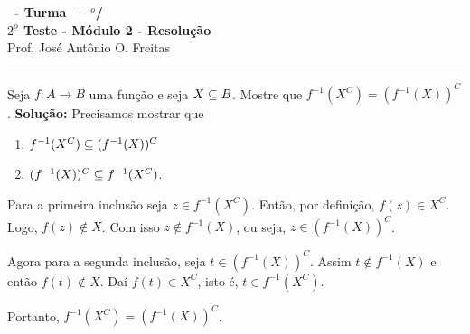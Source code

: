 \documentclass[12pt]{exam}
\begin{document}
\begin{center}
{\Large\bf \disciplina\ - Turma \turma\ -- \semestre$^{o}$/\ano} \\ \vspace{9pt} {\large\bf
$2^{\underline{o}}$ Teste - M\'odulo 2 - Resolu\c{c}\~ao}\\
\vspace{9pt} Prof. Jos{\'e} Ant{\^o}nio O. Freitas
\end{center}
\hrule

\vspace{.6cm}

\questao Seja $f : A \to B$ uma fun{\c c}{\~a}o e seja $X \subseteq B$. Mostre que $f^{-1}(X^C) = (f^{-1}(X))^C$.
\noindent\textbf{Solu\c{c}\~ao:} Precisamos mostrar que
\begin{enumerate}
    \item $f^{-1}(X^C) \subseteq (f^{-1}(X))^C$
    \item $(f^{-1}(X))^C \subseteq f^{-1}(X^C)$.
\end{enumerate}

Para a primeira inclusão seja $z \in f^{-1}(X^C)$. Então, por definição, $f(z) \in X^C$. Logo, $f(z) \notin X$. Com isso $z \notin f^{-1}(X)$, ou seja, $z \in (f^{-1}(X))^C$.

Agora para a segunda inclusão, seja $t \in (f^{-1}(X))^C$. Assim $t \notin f^{-1}(X)$ e então $f(t) \notin X$. Daí $f(t) \in X^C$, isto é, $t \in f^{-1}(X^C)$.

Portanto, $f^{-1}(X^C) = (f^{-1}(X))^C$.


\vspace{.5cm}
\end{document}
